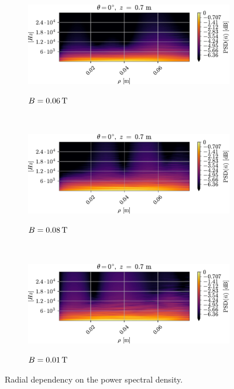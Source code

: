 \begin{figure}[htbp]
    \centering
    \begin{subfigure}[h]{1\textwidth}
        \centering
        \includegraphics{fig/results/poloidalFlow/PSD2D006}
        \label{fig:PSD2D006}
        \caption{$B=0.06\, \text{T}$}
    \end{subfigure}%
    \\
    \begin{subfigure}[h]{1\textwidth}
        \centering
        \includegraphics{fig/results/poloidalFlow/PSD2D008}
        \label{fig:PSD2D008}
        \caption{$B=0.08\, \text{T}$}
    \end{subfigure}
    \\
    \begin{subfigure}[h]{1\textwidth}
        \centering
        \includegraphics{fig/results/poloidalFlow/PSD2D01}
        \label{fig:PSD2D008B}
        \caption{$B=0.01\, \text{T}$}
    \end{subfigure}
    \caption{Radial dependency on the power spectral density.}
    \label{fig:PSD2D}
\end{figure}
%
